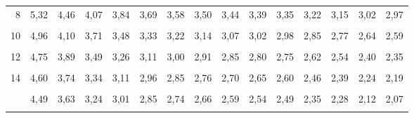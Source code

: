 \documentclass[
  ngerman,
]{article}
\begin{document}
\begin{table}[!h]
{\begin{tabular}{>{}r|rrrrrrrrrrrrrr}
8 & 5,32 & 4,46 & 4,07 & 3,84 & 3,69 & 3,58 & 3,50 & 3,44 & 3,39 & 3,35 & 3,22 & 3,15 & 3,02 & 2,97\\
\cellcolor{gray!6}{9} & \cellcolor{gray!6}{5,12} & \cellcolor{gray!6}{4,26} & \cellcolor{gray!6}{3,86} & \cellcolor{gray!6}{3,63} & \cellcolor{gray!6}{3,48} & \cellcolor{gray!6}{3,37} & \cellcolor{gray!6}{3,29} & \cellcolor{gray!6}{3,23} & \cellcolor{gray!6}{3,18} & \cellcolor{gray!6}{3,14} & \cellcolor{gray!6}{3,01} & \cellcolor{gray!6}{2,94} & \cellcolor{gray!6}{2,80} & \cellcolor{gray!6}{2,76}\\
10 & 4,96 & 4,10 & 3,71 & 3,48 & 3,33 & 3,22 & 3,14 & 3,07 & 3,02 & 2,98 & 2,85 & 2,77 & 2,64 & 2,59\\
\addlinespace
\cellcolor{gray!6}{11} & \cellcolor{gray!6}{4,84} & \cellcolor{gray!6}{3,98} & \cellcolor{gray!6}{3,59} & \cellcolor{gray!6}{3,36} & \cellcolor{gray!6}{3,20} & \cellcolor{gray!6}{3,09} & \cellcolor{gray!6}{3,01} & \cellcolor{gray!6}{2,95} & \cellcolor{gray!6}{2,90} & \cellcolor{gray!6}{2,85} & \cellcolor{gray!6}{2,72} & \cellcolor{gray!6}{2,65} & \cellcolor{gray!6}{2,51} & \cellcolor{gray!6}{2,46}\\
12 & 4,75 & 3,89 & 3,49 & 3,26 & 3,11 & 3,00 & 2,91 & 2,85 & 2,80 & 2,75 & 2,62 & 2,54 & 2,40 & 2,35\\
\cellcolor{gray!6}{13} & \cellcolor{gray!6}{4,67} & \cellcolor{gray!6}{3,81} & \cellcolor{gray!6}{3,41} & \cellcolor{gray!6}{3,18} & \cellcolor{gray!6}{3,03} & \cellcolor{gray!6}{2,92} & \cellcolor{gray!6}{2,83} & \cellcolor{gray!6}{2,77} & \cellcolor{gray!6}{2,71} & \cellcolor{gray!6}{2,67} & \cellcolor{gray!6}{2,53} & \cellcolor{gray!6}{2,46} & \cellcolor{gray!6}{2,31} & \cellcolor{gray!6}{2,26}\\
14 & 4,60 & 3,74 & 3,34 & 3,11 & 2,96 & 2,85 & 2,76 & 2,70 & 2,65 & 2,60 & 2,46 & 2,39 & 2,24 & 2,19\\
\cellcolor{gray!6}{15} & \cellcolor{gray!6}{4,54} & \cellcolor{gray!6}{3,68} & \cellcolor{gray!6}{3,29} & \cellcolor{gray!6}{3,06} & \cellcolor{gray!6}{2,90} & \cellcolor{gray!6}{2,79} & \cellcolor{gray!6}{2,71} & \cellcolor{gray!6}{2,64} & \cellcolor{gray!6}{2,59} & \cellcolor{gray!6}{2,54} & \cellcolor{gray!6}{2,40} & \cellcolor{gray!6}{2,33} & \cellcolor{gray!6}{2,18} & \cellcolor{gray!6}{2,12}\\
\addlinespace
16 & 4,49 & 3,63 & 3,24 & 3,01 & 2,85 & 2,74 & 2,66 & 2,59 & 2,54 & 2,49 & 2,35 & 2,28 & 2,12 & 2,07\\
\cellcolor{gray!6}{17} & \cellcolor{gray!6}{4,45} & \cellcolor{gray!6}{3,59} & \cellcolor{gray!6}{3,20} & \cellcolor{gray!6}{2,96} & \cellcolor{gray!6}{2,81} & \cellcolor{gray!6}{2,70} & \cellcolor{gray!6}{2,61} & \cellcolor{gray!6}{2,55} & \cellcolor{gray!6}{2,49} & \cellcolor{gray!6}{2,45} & \cellcolor{gray!6}{2,31} & \cellcolor{gray!6}{2,23} & \cellcolor{gray!6}{2,08} & \cellcolor{gray!6}{2,02}\\

\end{tabular}}
\end{table}
\end{document}
